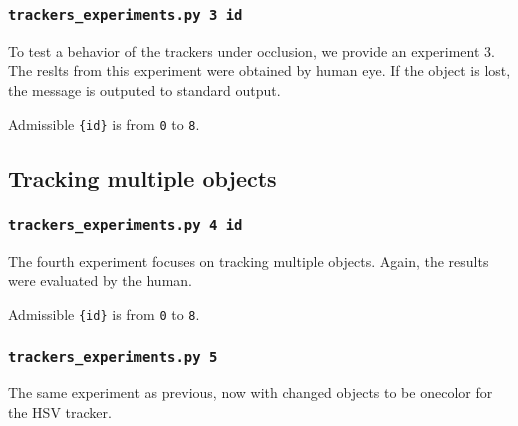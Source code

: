 \subsubsection*{\texttt{trackers{\_}experiments.py 3 {id}}}

To test a behavior of the trackers under occlusion, we provide an experiment 3.
The reslts from this experiment were obtained by human eye. If the object is
lost, the message is outputed to standard output.

Admissible \verb+{id}+ is from \verb+0+ to \verb+8+.

\subsection*{Tracking multiple objects}

\subsubsection*{\texttt{trackers{\_}experiments.py 4 {id}}}

The fourth experiment focuses on tracking multiple objects. Again, the results were
evaluated by the human. 

Admissible \verb+{id}+ is from \verb+0+ to \verb+8+.

\subsubsection*{\texttt{trackers{\_}experiments.py 5}}

The same experiment as previous, now with changed objects to be onecolor for
the HSV tracker.

